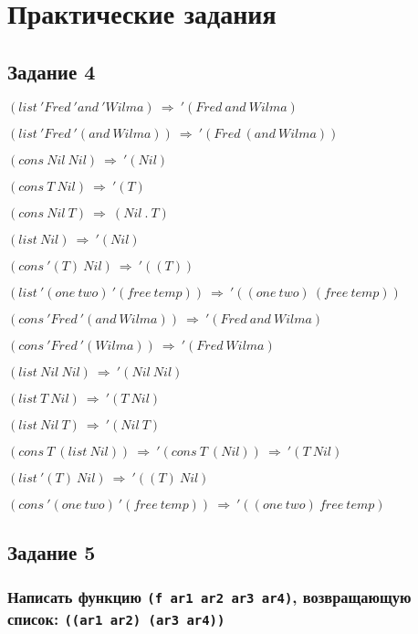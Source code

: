\chapter{Практические задания}

    \section{Задание 4}
    
        \( ( list\ 'Fred\ 'and\ 'Wilma )\ \Rightarrow\ '(Fred\ and\ Wilma)\)

        \( ( list\ 'Fred\ '(and\ Wilma) )\ \Rightarrow\ '(Fred\ (and\ Wilma))\)

        \( ( cons\ Nil\ Nil )\ \Rightarrow\ '(Nil)\)

        \( ( cons\ T\ Nil )\ \Rightarrow\ '(T)\)

        \( ( cons\ Nil\ T )\ \Rightarrow\ (Nil\ .\ T)\)

        \( ( list\ Nil )\ \Rightarrow\ '(Nil)\)

        \( ( cons\ '(T)\ Nil )\ \Rightarrow\ '((T))\)

        \( ( list\ '(one\ two)\ '(free\ temp) )\ \Rightarrow\ '((one\ two)\ (free\ temp))\)
        
        \bigskip

        \( ( cons\ 'Fred\ '(and\ Wilma) )\ \Rightarrow\ '(Fred\ and\ Wilma)\)

        \( ( cons\ 'Fred\ '(Wilma) )\ \Rightarrow\ '(Fred\ Wilma)\)

        \( ( list\ Nil\ Nil)\ \Rightarrow\ '(Nil\ Nil)\)

        \( ( list\ T\ Nil)\ \Rightarrow\ '(T\ Nil)\)

        \( ( list\ Nil\ T)\ \Rightarrow\ '(Nil\ T)\)

        \( ( cons\ T\ (list\ Nil))\ \Rightarrow\ '( cons\ T\ (Nil))\ \Rightarrow\ '(T\ Nil)\)

        \( ( list\ '(T)\ Nil )\ \Rightarrow\ '((T)\ Nil)\)

        \( ( cons\ '(one\ two)\ '(free\ temp) )\ \Rightarrow\ '((one\ two)\ free\ temp)\)
    
    \section{Задание 5}

        \subsection*{Написать функцию \texttt{(f ar1 ar2 ar3 ar4)}, возвращающую список: \texttt{((ar1 ar2) (ar3 ar4))}}

